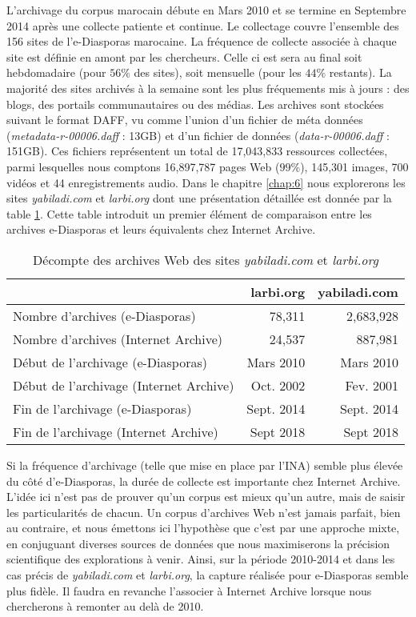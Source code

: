 \documentclass[symmetric,justified,marginals=raggedouter]{tufte-book}
\begin{document}
L'archivage du corpus marocain débute en Mars 2010 et se termine en Septembre 2014 après une collecte patiente et continue. Le collectage couvre l'ensemble des 156 sites de l'e-Diasporas marocaine. La fréquence de collecte associée à chaque site est définie en amont par les chercheurs. Celle ci est sera au final soit hebdomadaire (pour $56\%$ des sites), soit mensuelle (pour les $44\%$ restants). La majorité des sites archivés à la semaine sont les plus fréquements mis à jours : des blogs, des portails communautaires ou des médias. Les archives sont stockées suivant le format DAFF, vu comme l'union d'un fichier de méta données (\textit{metadata-r-00006.daff} : 13GB) et d'un fichier de données (\textit{data-r-00006.daff} : 151GB). Ces fichiers représentent un total de 17,043,833 ressources collectées, parmi lesquelles nous comptons 16,897,787 pages Web ($99\%$), 145,301 images, 700 vidéos et 44 enregistrements audio. Dans le chapitre \ref{chap:6} nous explorerons les sites \textit{yabiladi.com} et \textit{larbi.org} dont une présentation détaillée est donnée par la table \ref{tab:detail-archive}. Cette table introduit un premier élément de comparaison entre les archives e-Diasporas et leurs équivalents chez Internet Archive.

\begin{table}
  \label{tab:detail-archive}
  \begin{tabular}{lrr}
    \toprule
    &larbi.org&yabiladi.com\\
    \midrule
    Nombre d'archives (e-Diasporas)  & 78,311 & 2,683,928\\
    Nombre d'archives (Internet Archive) & 24,537 & 887,981\\
    \midrule
    Début de l'archivage  (e-Diasporas) & Mars 2010 & Mars 2010\\
    Début de l'archivage  (Internet Archive) & Oct. 2002 & Fev. 2001\\
    \midrule
    Fin de l'archivage  (e-Diasporas) & Sept. 2014 & Sept. 2014\\
    Fin de l'archivage  (Internet Archive) & Sept 2018 & Sept 2018\\    
  \bottomrule
\end{tabular}
  \bigskip
  \caption{Décompte des archives Web des sites \textit{yabiladi.com} et \textit{larbi.org}}
\end{table} 


\noindent Si la fréquence d'archivage (telle que mise en place par l'INA) semble plus élevée du côté d'e-Diasporas, la durée de collecte est importante chez Internet Archive. L'idée ici n'est pas de prouver qu'un corpus est mieux qu'un autre, mais de saisir les particularités de chacun. Un corpus d'archives Web n'est jamais parfait, bien au contraire, et nous émettons ici l'hypothèse que c'est par une approche mixte, en conjuguant diverses sources de données que nous maximiserons la précision scientifique des explorations à venir. Ainsi, sur la période 2010-2014 et dans les cas précis de \textit{yabiladi.com} et \textit{larbi.org}, la capture réalisée pour e-Diasporas semble plus fidèle. Il faudra en revanche l'associer à Internet Archive lorsque nous chercherons à remonter au delà de 2010. 
\end{document}
